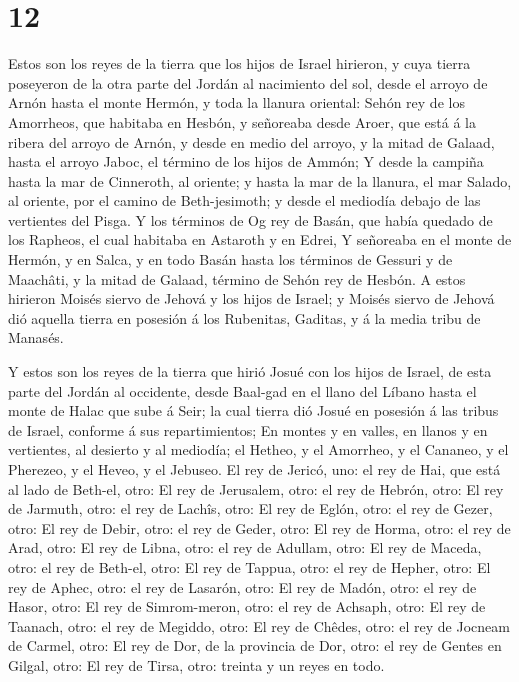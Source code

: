\hypertarget{section-11}{%
\section{12}\label{section-11}}

 Estos son los reyes de la tierra que los hijos de Israel
hirieron, y cuya tierra poseyeron de la otra parte del Jordán al
nacimiento del sol, desde el arroyo de Arnón hasta el monte Hermón, y
toda la llanura oriental:  Sehón rey de los Amorrheos, que
habitaba en Hesbón, y señoreaba desde Aroer, que está á la ribera del
arroyo de Arnón, y desde en medio del arroyo, y la mitad de Galaad,
hasta el arroyo Jaboc, el término de los hijos de Ammón;  Y
desde la campiña hasta la mar de Cinneroth, al oriente; y hasta la mar
de la llanura, el mar Salado, al oriente, por el camino de
Beth-jesimoth; y desde el mediodía debajo de las vertientes del Pisga.
 Y los términos de Og rey de Basán, que había quedado de los
Rapheos, el cual habitaba en Astaroth y en Edrei,  Y
señoreaba en el monte de Hermón, y en Salca, y en todo Basán hasta los
términos de Gessuri y de Maachâti, y la mitad de Galaad, término de
Sehón rey de Hesbón.  A estos hirieron Moisés siervo de
Jehová y los hijos de Israel; y Moisés siervo de Jehová dió aquella
tierra en posesión á los Rubenitas, Gaditas, y á la media tribu de
Manasés.

 Y estos son los reyes de la tierra que hirió Josué con los
hijos de Israel, de esta parte del Jordán al occidente, desde Baal-gad
en el llano del Líbano hasta el monte de Halac que sube á Seir; la cual
tierra dió Josué en posesión á las tribus de Israel, conforme á sus
repartimientos;  En montes y en valles, en llanos y en
vertientes, al desierto y al mediodía; el Hetheo, y el Amorrheo, y el
Cananeo, y el Pherezeo, y el Heveo, y el Jebuseo.  El rey de
Jericó, uno: el rey de Hai, que está al lado de Beth-el, otro:
 El rey de Jerusalem, otro: el rey de Hebrón, otro:
 El rey de Jarmuth, otro: el rey de Lachîs, otro:
 El rey de Eglón, otro: el rey de Gezer, otro:
 El rey de Debir, otro: el rey de Geder, otro:
 El rey de Horma, otro: el rey de Arad, otro: 
El rey de Libna, otro: el rey de Adullam, otro:  El rey de
Maceda, otro: el rey de Beth-el, otro:  El rey de Tappua,
otro: el rey de Hepher, otro:  El rey de Aphec, otro: el
rey de Lasarón, otro:  El rey de Madón, otro: el rey de
Hasor, otro:  El rey de Simrom-meron, otro: el rey de
Achsaph, otro:  El rey de Taanach, otro: el rey de Megiddo,
otro:  El rey de Chêdes, otro: el rey de Jocneam de Carmel,
otro:  El rey de Dor, de la provincia de Dor, otro: el rey
de Gentes en Gilgal, otro:  El rey de Tirsa, otro: treinta
y un reyes en todo.

